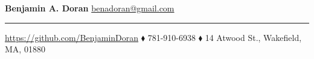 \documentclass[hidelinks, 11pt]{article}
\begin{document}
\newcommand{\sectiontext}[1]{\bf\color{sectioncolor}#1}
\newcommand{\titletext}[1]{{\large\bf #1}}
\newcommand{\experiencetitle}[4]{
\titletext{#1}, {#2}  \hspace*{\fill} \emph{#3} \\ 
\emph{#4}\vspace{-6pt}
}

\begin{center}
{\huge\bf Benjamin A. Doran} \hspace*{\fill}  
{\color{blue} \href{mailto://benadoran@gmail.com}{\large benadoran@gmail.com}}
\hrule
\vspace{6pt}
{\color{blue}\url{https://github.com/BenjaminDoran}} $\blacklozenge$ 781-910-6938 $\blacklozenge$ 14 Atwood St., Wakefield, MA, 01880
\end{center}
\vspace{-6pt}


\end{document}
